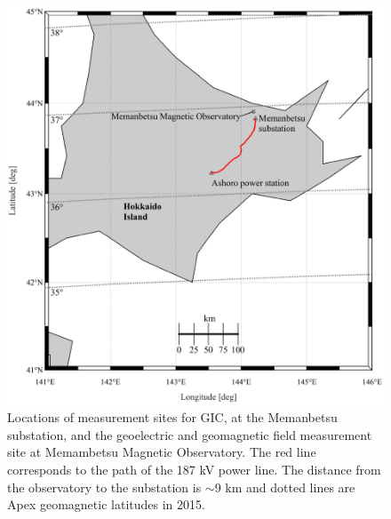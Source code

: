 \documentclass[draft,linenumbers]{agujournal2018}
\begin{document}
\begin{figure}[h]
\centering
\includegraphics[width=\textwidth]{figures/map.pdf}
\caption{Locations of measurement sites for GIC, at the Memanbetsu substation, and the geoelectric and geomagnetic field measurement site at Memambetsu Magnetic Observatory. The red line corresponds to the path of the 187 kV power line. The distance from the observatory to the substation is $\sim$9 km and dotted lines are Apex geomagnetic latitudes \citep{Richmond1995} in 2015.}
\label{map}
\end{figure}
\end{document}

